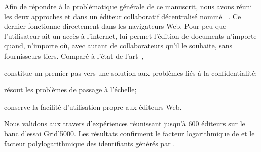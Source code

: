 Afin de répondre à la problématique générale de ce manuscrit, nous avons réuni
les deux approches \LSEQ et \SPRAY dans un éditeur collaboratif décentralisé
nommé \CRATE~\cite{nedelec2016crate}. Ce dernier fonctionne directement dans les
navigateurs Web. Pour peu que l'utilisateur ait un accès à l'internet, \CRATE
lui permet l'édition de documents n'importe quand, n'importe où, avec autant de
collaborateurs qu'il le souhaite, sans fournisseurs tiers. Comparé à l'état de
l'art~\cite{etherpad, googledocs, hivejs, lautamaki2012cored,
  nicolaescu2015yjs},
\begin{inparaenum}[(i)]
\item \CRATE constitue un premier pas vers une solution aux problèmes liés à la
  confidentialité;
\item \CRATE résout les problèmes de passage à l'échelle;
\item \CRATE conserve la facilité d'utilisation propre aux éditeurs Web.
\end {inparaenum}
Nous validons \CRATE aux travers d'expériences réunissant jusqu'à 600 éditeurs
sur le banc d'essai Grid'5000. Les résultats confirment le facteur logarithmique
de \SPRAY et le facteur polylogarithmique des identifiants générés par \LSEQ.



